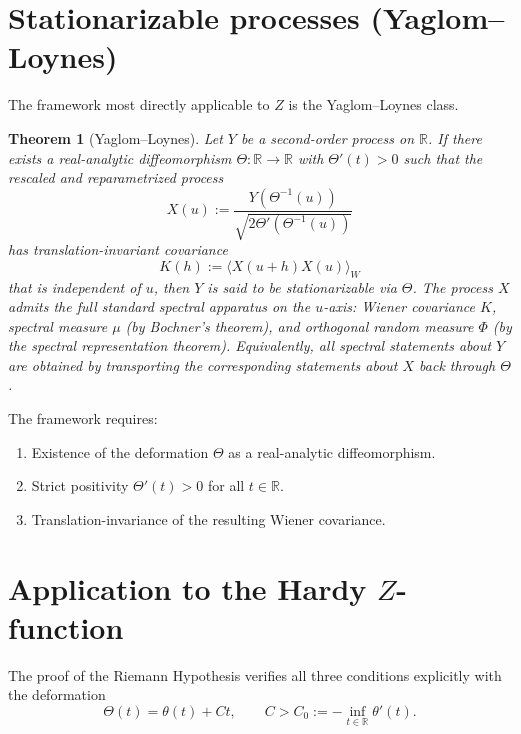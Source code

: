 \documentclass[11pt]{amsart}
\theoremstyle{plain}
\newtheorem{theorem}{Theorem}
\newcommand{\R}{\mathbb{R}}
\begin{document}
\section{Stationarizable processes (Yaglom--Loynes)}

The framework most directly applicable to $Z$ is the Yaglom--Loynes class.

\begin{theorem}[Yaglom--Loynes]
Let $Y$ be a second-order process on $\R$. If there exists a real-analytic diffeomorphism $\Theta : \R \to \R$ with $\Theta'(t) > 0$ such that the rescaled and reparametrized process
\[
X(u) := \frac{Y(\Theta^{-1}(u))}{\sqrt{2\Theta'(\Theta^{-1}(u))}}
\]
has translation-invariant covariance
\[
K(h) := \langle X(u+h) X(u)\rangle_W
\]
that is independent of $u$, then $Y$ is said to be \emph{stationarizable} via $\Theta$. The process $X$ admits the full standard spectral apparatus on the $u$-axis: Wiener covariance $K$, spectral measure $\mu$ (by Bochner's theorem), and orthogonal random measure $\Phi$ (by the spectral representation theorem). Equivalently, all spectral statements about $Y$ are obtained by transporting the corresponding statements about $X$ back through $\Theta$.
\end{theorem}

The framework requires:
\begin{enumerate}
\item Existence of the deformation $\Theta$ as a real-analytic diffeomorphism.
\item Strict positivity $\Theta'(t) > 0$ for all $t \in \R$.
\item Translation-invariance of the resulting Wiener covariance.
\end{enumerate}

\section{Application to the Hardy $Z$-function}

The proof of the Riemann Hypothesis verifies all three conditions explicitly with the deformation
\[
\Theta(t) = \theta(t) + Ct, \qquad C > C_0 := -\inf_{t \in \R}\theta'(t).
\]
\end{document}
